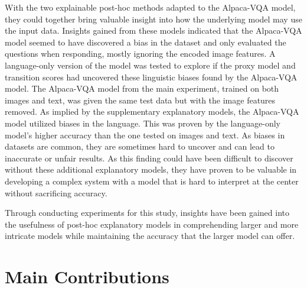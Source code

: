     With the two explainable post-hoc methods adapted to the Alpaca-VQA model, they could together bring valuable insight into how the underlying model may use the input data. 
    Insights gained from these models indicated that the Alpaca-VQA model seemed to have discovered a bias in the dataset and only evaluated the questions when responding, mostly ignoring the encoded image features. 
    A language-only version of the model was tested to explore if the proxy model and transition scores had uncovered these linguistic biases found by the Alpaca-VQA model.
    The Alpaca-VQA model from the main experiment, trained on both images and text, was given the same test data but with the image features removed. As implied by the supplementary explanatory models, the Alpaca-VQA model utilized biases in the language. This was proven by the language-only model's higher accuracy than the one tested on images and text. 
    As biases in datasets are common, they are sometimes hard to uncover and can lead to inaccurate or unfair results.
    As this finding could have been difficult to discover without these additional explanatory models, they have proven to be valuable in developing a complex system with a model that is hard to interpret at the center without sacrificing accuracy. 

    Through conducting experiments for this study, insights have been gained into the usefulness of post-hoc explanatory models in comprehending larger and more intricate models while maintaining the accuracy that the larger model can offer. 




\section{Main Contributions}
\label{sec:5_3_main_contributions}

\begin{comment}
    Again, you "sell" your work. Convince that you have performed a great piece of research (meaning, stay honest and to the facts, but make sure that all your achievements are listed). What are your main contributions? What have you and the readers learned? What is the main knowledge gained? Put this in the context of section 1.2 - problem statement. 
    Detail out how your research/work answers the initially stated challenges and what the "answers" are. Usually, the main goal/question/objective is repeated and then answered.
\end{comment}

